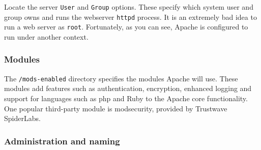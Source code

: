 \documentclass{article}
\begin{document}
Locate the server {\tt User} and {\tt Group} options.  These specify which system user and group owns and runs the webserver {\tt httpd} process.  It is an extremely bad idea to run a web server as {\tt root}. Fortunately, as you can see, Apache is configured to run under another context.  


\subsubsection{Modules}

The {\tt /mods-enabled} directory specifies the modules Apache will use. These modules add features such as authentication, encryption, enhanced logging and support for languages such as php and Ruby to the Apache core functionality. One popular third-party module is modsecurity, provided by Trustwave SpiderLabs.   


\subsubsection{Administration and naming}
\end{document}
